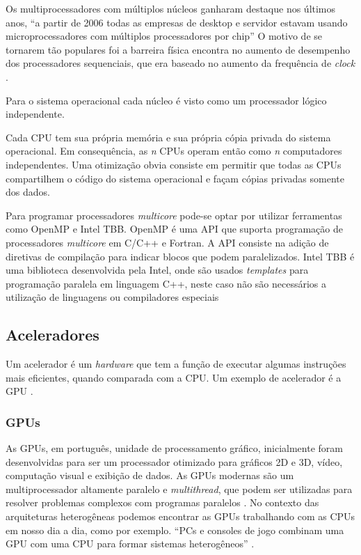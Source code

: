 Os multiprocessadores com múltiplos núcleos ganharam destaque nos últimos anos, “a partir de 2006 todas as empresas de desktop e servidor estavam usando microprocessadores com múltiplos processadores por chip” \cite[p.~31]{hennessy2014organizaccao}
O motivo de se tornarem tão populares foi a barreira física encontra no aumento de desempenho dos processadores sequenciais, que era baseado no aumento da frequência de \textit{clock} \cite{hennessy2014organizaccao}.

Para o sistema operacional cada núcleo é visto como um processador lógico independente.

\begin{citacao}
Cada CPU tem sua própria memória e sua própria cópia privada do sistema operacional.
Em consequência, as \emph{n} CPUs operam então como \emph{n} computadores independentes.
Uma otimização obvia consiste em permitir que todas as CPUs compartilhem o código do sistema operacional e façam cópias privadas somente dos dados. \cite[p.~331]{tanenbaum20103a}
\end{citacao}

Para programar processadores \textit{multicore} pode-se optar por utilizar ferramentas como OpenMP e Intel TBB.
OpenMP é uma API que suporta programação de processadores \textit{multicore} em C/C++ e Fortran.
A API consiste na adição de diretivas de compilação para indicar blocos que podem paralelizados.
Intel TBB é uma biblioteca desenvolvida pela Intel, onde são usados \textit{templates} para programação paralela em linguagem C++,
neste caso não são necessários a utilização de linguagens ou compiladores especiais

\subsection{Aceleradores}
Um acelerador é um \textit{hardware} que tem a função de executar algumas instruções mais eficientes,
quando comparada com a CPU. Um exemplo de acelerador é a GPU \cite{kindratenko2010high}.

\subsubsection{GPUs}
As GPUs, em português, unidade de processamento gráfico, inicialmente foram desenvolvidas para ser um processador otimizado para gráficos 2D e 3D, vídeo,
computação visual e exibição de dados.
As GPUs modernas são um multiprocessador altamente paralelo e \textit{multithread}, que podem ser utilizadas para resolver problemas complexos com programas paralelos \cite{hennessy2014organizaccao}.
No contexto das arquiteturas heterogêneas podemos encontrar as GPUs trabalhando com as CPUs em nosso dia a dia, como por exemplo.
“PCs e consoles de jogo combinam uma GPU com uma CPU para formar sistemas heterogêneos” \cite[p.~A-569]{hennessy2014organizaccao}.


